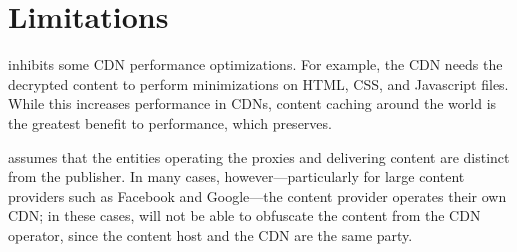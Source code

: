 \section{Limitations}
\label{sec:discussion}


\system{} inhibits some CDN performance optimizations.  For
example,
the CDN needs the 
decrypted content to perform minimizations on HTML, CSS, and Javascript files.  While 
this increases performance in CDNs, content caching around the world is the greatest benefit to 
performance, which \system{} preserves.

\system{}
assumes that the entities operating the proxies and delivering content are
distinct from the publisher. In many cases, however---particularly
for large content providers such as Facebook and Google---the
content provider operates their own CDN; in these cases, \system{} will
not be able to obfuscate the content from the CDN operator, since the content host
and the CDN are the same party.  %

